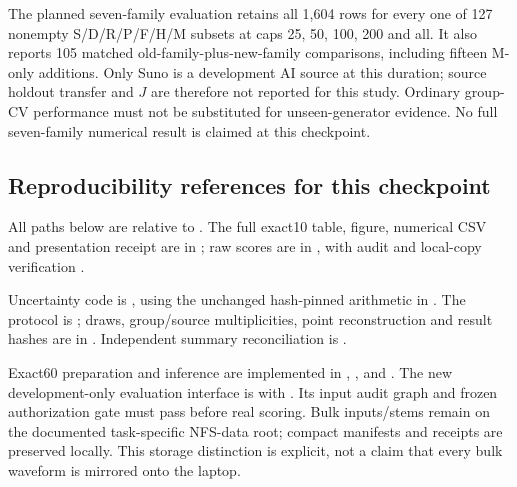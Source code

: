 The planned seven-family evaluation retains all 1,604 rows for every one of
127 nonempty S/D/R/P/F/H/M subsets at caps 25, 50, 100, 200 and all. It also
reports 105 matched old-family-plus-new-family comparisons, including fifteen
M-only additions. Only Suno is a development AI source at this duration; source
holdout transfer and $J$ are therefore not reported for this study. Ordinary
group-CV performance must not be substituted for unseen-generator evidence.
No full seven-family numerical result is claimed at this checkpoint.

\subsection{Reproducibility references for this checkpoint}
All paths below are relative to
. The full exact10 table,
figure, numerical CSV and presentation receipt are in
; raw scores are in
, with audit
 and local-copy verification
.

Uncertainty code is , using
the unchanged hash-pinned arithmetic in .
The protocol is ; draws, group/source
multiplicities, point reconstruction and result hashes are in
. Independent summary reconciliation is
.

Exact60 preparation and inference are implemented in
,
,
 and
. The new development-only evaluation
interface is  with
. Its input audit graph and frozen
authorization gate must pass before real scoring. Bulk inputs/stems remain on
the documented task-specific NFS-data root; compact manifests and receipts
are preserved locally. This storage distinction is explicit, not a claim that
every bulk waveform is mirrored onto the laptop.
